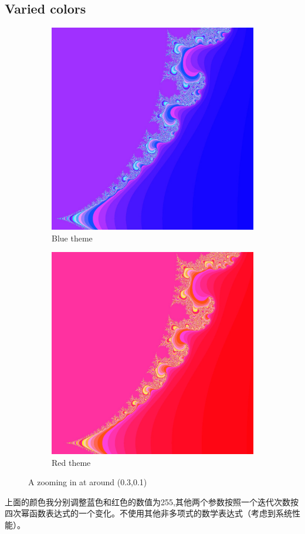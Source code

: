 \documentclass{ctexart}
\begin{document}
\subsection{Varied colors}
\begin{figure}[H]

\begin{subfigure}{0.5\textwidth}
	\centering
	\includegraphics[width=0.9\linewidth]{blue.jpg}
	\caption{Blue theme}
\end{subfigure}
\begin{subfigure}{0.5\textwidth}
	\centering
	\includegraphics[width=0.9\linewidth]{red1.jpg}
	\caption{Red theme}
\end{subfigure}
\caption{A zooming in at around (0.3,0.1)}
\end{figure}
上面的颜色我分别调整蓝色和红色的数值为255,其他两个参数按照一个迭代次数按四次幂函数表达式的一个变化。不使用其他非多项式的数学表达式（考虑到系统性能）。
\end{document}
